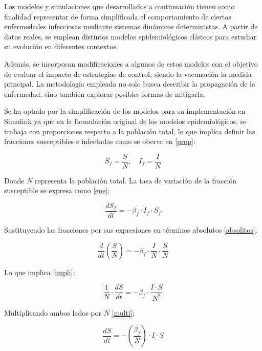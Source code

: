Los modelos y simulaciones que desarrollados a continuación tienen como finalidad representar de forma simplificada el comportamiento de ciertas enfermedades infecciosas mediante sistemas dinámicos deterministas. A partir de datos reales, se emplean distintos modelos epidemiológicos clásicos para estudiar su evolución en diferentes contextos.

Además, se incorporan modificaciones a algunos de estos modelos con el objetivo de evaluar el impacto de estrategias de control, siendo la vacunación la medida principal. La metodología empleada no solo busca describir la propagación de la enfermedad, sino también explorar posibles formas de mitigarla.


Se ha optado por la simplificación de los modelos para su implementación en Simulink ya que 
en la formulación original de los modelos epidemiológicos, se trabaja con proporciones respecto a la población total, lo que implica definir las fracciones susceptibles e infectadas como se oberva en \eqref{prop}:

\begin{equation}
    S_f = \frac{S}{N}, \quad I_f = \frac{I}{N}
\label{prop}
\end{equation}

Donde \( N \) representa la población total. La tasa de variación de la fracción susceptible se expresa como \eqref{ene}:

\begin{equation}
    \frac{dS_f}{dt} = -\beta_f \cdot I_f \cdot S_f
\label{ene}
\end{equation}

Sustituyendo las fracciones por sus expresiones en términos absolutos \eqref{absolitos}.

\begin{equation}
    \frac{d}{dt} \left( \frac{S}{N} \right) = -\beta_f \cdot \frac{I}{N} \cdot \frac{S}{N}
\label{absolitos}
\end{equation}

Lo que implica \eqref{impli}:

\begin{equation}
    \frac{1}{N} \cdot \frac{dS}{dt} = -\beta_f \cdot \frac{I \cdot S}{N^2}
\label{impli}
\end{equation}

Multiplicando ambos lados por \( N \) \eqref{multi}:

\begin{equation}
    \frac{dS}{dt} = -\left( \frac{\beta_f}{N} \right) \cdot I \cdot S
\label{multi}
\end{equation}

